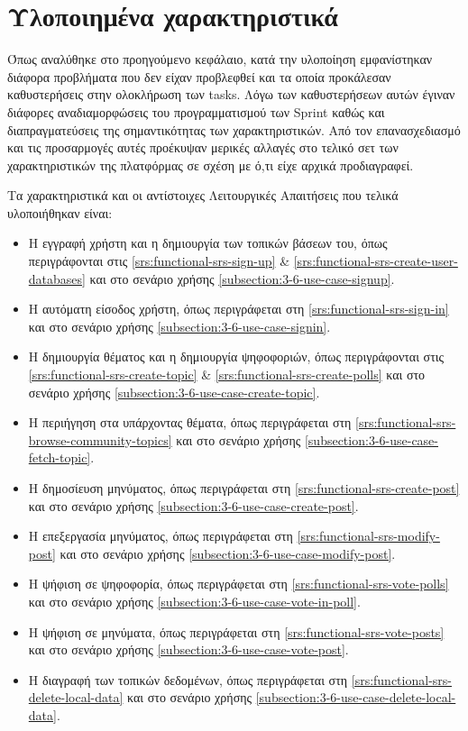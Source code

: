 \section{Υλοποιημένα χαρακτηριστικά} \label{section:4-5-implemented-parts}

Όπως αναλύθηκε στο προηγούμενο κεφάλαιο, κατά την υλοποίηση εμφανίστηκαν διάφορα προβλήματα που δεν είχαν προβλεφθεί και τα οποία προκάλεσαν καθυστερήσεις στην ολοκλήρωση των tasks. Λόγω των καθυστερήσεων αυτών έγιναν διάφορες αναδιαμορφώσεις του προγραμματισμού των Sprint καθώς και διαπραγματεύσεις της σημαντικότητας των χαρακτηριστικών. Από τον επανασχεδιασμό και τις προσαρμογές αυτές προέκυψαν μερικές αλλαγές στο τελικό σετ των χαρακτηριστικών της πλατφόρμας σε σχέση με ό,τι είχε αρχικά προδιαγραφεί.

Τα χαρακτηριστικά και οι αντίστοιχες Λειτουργικές Απαιτήσεις που τελικά υλοποιήθηκαν είναι:

\begin{itemize}
    \item Η εγγραφή χρήστη και η δημιουργία των τοπικών βάσεων του, όπως περιγράφονται στις \ref{srs:functional-srs-sign-up} \& \ref{srs:functional-srs-create-user-databases} και στο σενάριο χρήσης \ref{subsection:3-6-use-case-signup}.
    \item Η αυτόματη είσοδος χρήστη, όπως περιγράφεται στη \ref{srs:functional-srs-sign-in} και στο σενάριο χρήσης \ref{subsection:3-6-use-case-signin}.
    \item Η δημιουργία θέματος και η δημιουργία ψηφοφοριών, όπως περιγράφονται στις \ref{srs:functional-srs-create-topic} \& \ref{srs:functional-srs-create-polls} και στο σενάριο χρήσης \ref{subsection:3-6-use-case-create-topic}.
    \item Η περιήγηση στα υπάρχοντας θέματα, όπως περιγράφεται στη \ref{srs:functional-srs-browse-community-topics} και στο σενάριο χρήσης \ref{subsection:3-6-use-case-fetch-topic}.
    \item Η δημοσίευση μηνύματος, όπως περιγράφεται στη \ref{srs:functional-srs-create-post} και στο σενάριο χρήσης \ref{subsection:3-6-use-case-create-post}.
    \item Η επεξεργασία μηνύματος, όπως περιγράφεται στη \ref{srs:functional-srs-modify-post} και στο σενάριο χρήσης \ref{subsection:3-6-use-case-modify-post}.
    \item Η ψήφιση σε ψηφοφορία, όπως περιγράφεται στη \ref{srs:functional-srs-vote-polls} και στο σενάριο χρήσης \ref{subsection:3-6-use-case-vote-in-poll}.
    \item Η ψήφιση σε μηνύματα, όπως περιγράφεται στη \ref{srs:functional-srs-vote-posts} και στο σενάριο χρήσης \ref{subsection:3-6-use-case-vote-post}.
    \item Η διαγραφή των τοπικών δεδομένων, όπως περιγράφεται στη \ref{srs:functional-srs-delete-local-data} και στο σενάριο χρήσης \ref{subsection:3-6-use-case-delete-local-data}.
\end{itemize}

